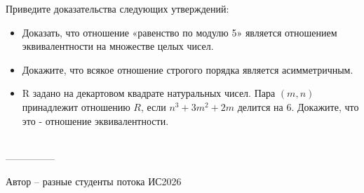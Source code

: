 \question
Приведите доказательства следующих утверждений:
\begin{itemize}
    \item Доказать, что отношение «равенство по модулю 5» является отношением эквивалентности на множестве целых чисел.
    \item Докажите, что всякое отношение строгого порядка является асимметричным.
    \item R задано на декартовом квадрате натуральных чисел. Пара $(m,n)$ принадлежит отношению $R$, если $n^3 + 3m^2 + 2m$ делится на 6. Докажите, что это - отношение эквивалентности.
\end{itemize}
\\
---------------

Автор -- разные студенты потока ИС2026
